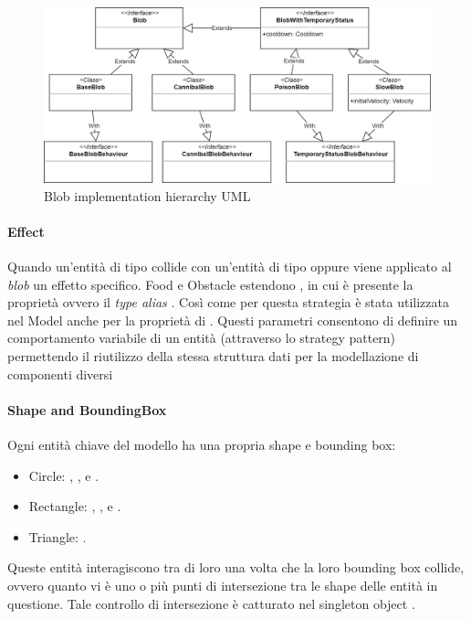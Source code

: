 \begin{figure}[h!]
\centering
\includegraphics[width=\textwidth, scale=0.44]{img/Blob implementation.png}
\caption{Blob implementation hierarchy  UML}
\label{fig:Blob implementation}
\end{figure}

\paragraph{Effect} Quando un'entità di tipo  collide con un'entità di tipo  oppure  viene applicato al \textit{blob} un effetto specifico. Food e Obstacle estendono , in cui è presente la proprietà  ovvero il \textit{type alias} .
Così come per  questa strategia è stata utilizzata nel Model anche per la proprietà di .
Questi parametri consentono di definire un comportamento variabile di un entità (attraverso lo strategy pattern) permettendo il riutilizzo della stessa struttura dati per la modellazione di componenti diversi

\paragraph{Shape and BoundingBox} Ogni entità chiave del modello ha una propria shape e bounding box:
\begin{itemize}
    \item Circle: , ,  e .
    \item Rectangle: , ,  e .
    \item Triangle: .
\end{itemize}
Queste entità interagiscono tra di loro una volta che la loro bounding box collide, ovvero quanto vi è uno o più punti di intersezione tra le shape delle entità in questione. Tale controllo di intersezione è catturato nel singleton object .


